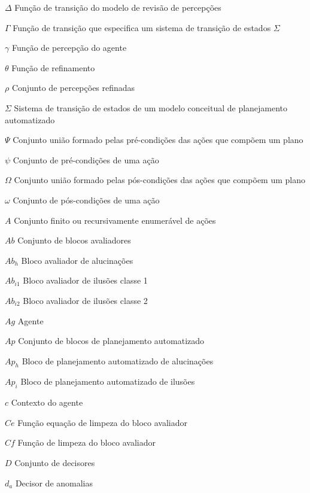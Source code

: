 
\begin{simbolos}
  \item[$ \Delta $] Função de transição do modelo de revisão de percepções
  \item[$ \Gamma $] Função de transição que especifica um sistema de transição de estados $\Sigma$
  \item[$ \gamma $] Função de percepção do agente
  \item[$ \theta $] Função de refinamento
  \item[$ \rho $] Conjunto de percepções refinadas
  \item[$ \Sigma $] Sistema de transição de estados de um modelo conceitual de planejamento automatizado
  \item[$ \Psi $] Conjunto união formado pelas pré-condições das ações que compõem um plano
  \item[$ \psi $] Conjunto de pré-condições de uma ação
  \item[$ \Omega $] Conjunto união formado pelas pós-condições das ações que compõem um plano
  \item[$ \omega $] Conjunto de pós-condições de uma ação
  \item[$ A $] Conjunto finito ou recursivamente enumerável de ações
  \item[$ Ab $] Conjunto de blocos avaliadores
  \item[$ Ab_{h} $] Bloco avaliador de alucinações
  \item[$ Ab_{i1} $] Bloco avaliador de ilusões classe 1
  \item[$ Ab_{i2} $] Bloco avaliador de ilusões classe 2
  \item[$ Ag$ ] Agente
  \item[$ Ap $] Conjunto de blocos de planejamento automatizado
  \item[$ Ap_{h} $] Bloco de planejamento automatizado de alucinações
  \item[$ Ap_{i} $] Bloco de planejamento automatizado de ilusões
  \item[$ c $] Contexto do agente
  \item[$ Ce $] Função equação de limpeza do bloco avaliador
  \item[$ Cf $] Função de limpeza do bloco avaliador
  \item[$ D $] Conjunto de decisores
  \item[$ d_{a} $] Decisor de anomalias

\end{simbolos}

